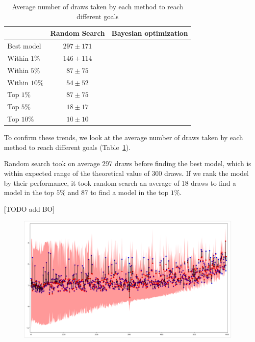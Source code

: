 \begin{table}[htb]
	\centering
	\begin{tabular}{ | l | c | c | }
		\hline
		 & Random Search & Bayesian optimization \\ 
		\hline
		Best model & $297 \pm 171$ &  \\
		\hline
		Within $1 \%$ & $146 \pm 114$ & \\
		Within $5 \%$ & $87 \pm 75$ & \\
		Within $10 \%$ & $54 \pm 52$ & \\
		\hline
		Top $1 \%$ & $87 \pm 75$ &  \\
		Top $5 \%$ & $18 \pm 17$ &  \\
		Top $10 \%$ & $10 \pm 10$ &  \\
		\hline
	\end{tabular}
	\caption{Average number of draws taken by each method to reach different goals}
	\label{table:search_average}
\end{table}

To confirm these trends, we look at the average number of draws taken by each method to reach different goals (Table~\ref{table:search_average}).

Random search took on average 297 draws before finding the best model, which is within expected range of the theoretical value of 300 draws. If we rank the model by their performance, it took random search an average of 18 draws to find a model in the top $5\%$ and 87 to find a model in the top $1\%$.

[TODO add BO]

\begin{figure}[htb]
	\centering
	\includegraphics[width=\linewidth]{img_hyperopt/bo_error_time.png}
	\label{fig:bo_error_time}
\end{figure}

